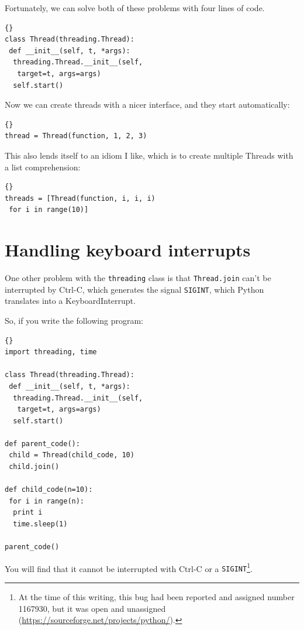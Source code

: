 \documentclass{book}
\begin{document}
Fortunately, we can solve both of these problems with four
lines of code.

\begin{lstlisting}[title={Cleaned-up Thread class}]{}
class Thread(threading.Thread):
 def __init__(self, t, *args):
  threading.Thread.__init__(self, 
   target=t, args=args)
  self.start()
\end{lstlisting}

Now we can create threads with a nicer interface, and they
start automatically:

\begin{lstlisting}[title={Thread example (my way)}]{}
thread = Thread(function, 1, 2, 3)
\end{lstlisting}

This also lends itself to an idiom I like, which is to create
multiple Threads with a list comprehension:

\begin{lstlisting}[title={Multiple thread example}]{}
threads = [Thread(function, i, i, i)  
 for i in range(10)]
\end{lstlisting}

\section{Handling keyboard interrupts}

One other problem with the {\tt threading} class is that
    {\tt Thread.join} can't be interrupted by Ctrl-C, which
generates the signal {\tt SIGINT}, which Python translates
into a KeyboardInterrupt.

\newpage
So, if you write the following program:

\begin{lstlisting}[title={Unstoppable program}]{}
import threading, time

class Thread(threading.Thread):
 def __init__(self, t, *args):
  threading.Thread.__init__(self, 
   target=t, args=args)
  self.start()

def parent_code():
 child = Thread(child_code, 10)
 child.join()

def child_code(n=10):
 for i in range(n):
  print i
  time.sleep(1)
    
parent_code()
\end{lstlisting}

You will find that it cannot be interrupted with Ctrl-C or
a {\tt SIGINT}\footnote{At the time of this writing, this
    bug had been reported and assigned number 1167930, but it was
    open and unassigned (\url{https://sourceforge.net/projects/python/}).}.
\end{document}
